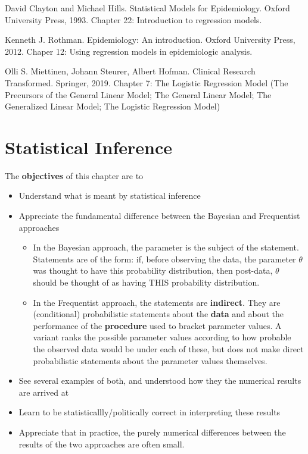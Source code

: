 \documentclass[]{book}
\begin{document}
David Clayton and Michael Hills. Statistical Models for Epidemiology. Oxford University Press, 1993. Chapter 22: Introduction to regression models.

Kenneth J. Rothman. Epidemiology: An introduction.
Oxford University Press, 2012. Chaper 12: Using regression models in epidemiologic analysis.

Olli S. Miettinen, Johann Steurer, Albert Hofman.
Clinical Research Transformed. Springer, 2019.
Chapter 7: The Logistic Regression Model (The Precursors of the General Linear Model; The General Linear Model; The Generalized Linear Model; The Logistic Regression Model)

\hypertarget{inference}{%
\chapter{Statistical Inference}\label{inference}}

The \textbf{objectives} of this chapter are to

\begin{itemize}
\item
  Understand what is meant by statistical inference
\item
  Appreciate the fundamental difference between the Bayesian and Frequentist approaches

  \begin{itemize}
  \item
    In the Bayesian approach, the parameter is the subject of the statement. Statements are of the form: if, before observing the data, the parameter \(\theta\) was thought to have this probability distribution, then post-data, \(\theta\) should be thought of as having THIS probability distribution.
  \item
    In the Frequentist approach, the statements are \textbf{indirect}. They are (conditional) probabilistic statements about the \textbf{data} and about the performance of the \textbf{procedure} used to bracket parameter values. A variant ranks the possible parameter values according to how probable the observed data would be under each of these, but does not make direct probabilistic statements about the parameter values themselves.
  \end{itemize}
\item
  See several examples of both, and understood how they the numerical results are arrived at
\item
  Learn to be statisticallly/politically correct in interpreting these results
\item
  Appreciate that in practice, the purely numerical differences between the results of the two approaches are often small.
\end{itemize}
\end{document}
